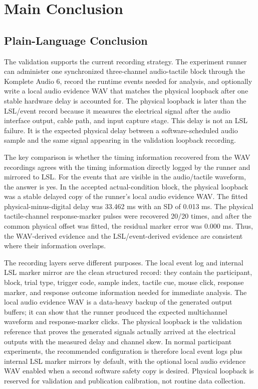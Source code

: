 \documentclass[11pt]{article}
\begin{document}
\section{Main Conclusion}

\subsection{Plain-Language Conclusion}

The validation supports the current recording strategy. The experiment runner
can administer one synchronized three-channel audio-tactile block through the
Komplete Audio 6, record the runtime events needed for analysis, and optionally
write a local audio evidence WAV that matches the physical loopback after one
stable hardware delay is accounted for. The physical loopback is later than the
LSL/event record because it measures the electrical signal after the audio
interface output, cable path, and input capture stage. This delay is not an LSL
failure. It is the expected physical delay between a software-scheduled audio
sample and the same signal appearing in the validation loopback recording.

The key comparison is whether the timing information recovered from the WAV
recordings agrees with the timing information directly logged by the runner and
mirrored to LSL. For the events that are visible in the audio/tactile waveform,
the answer is yes. In the accepted actual-condition block, the physical loopback
was a stable delayed copy of the runner's local audio evidence WAV. The fitted
physical-minus-digital delay was 33.462 ms with an SD of 0.013 ms. The physical
tactile-channel response-marker pulses were recovered 20/20 times, and after
the common physical offset was fitted, the residual marker error was 0.000 ms.
Thus, the WAV-derived evidence and the LSL/event-derived evidence are
consistent where their information overlaps.

The recording layers serve different purposes. The local event log and internal
LSL marker mirror are the clean structured record: they contain the participant,
block, trial type, trigger code, sample index, tactile cue, mouse click, response
marker, and response outcome information needed for immediate analysis. The
local audio evidence WAV is a data-heavy backup of the generated output buffers;
it can show that the runner produced the expected multichannel waveform and
response-marker clicks. The physical loopback is the validation reference that
proves the generated signals actually arrived at the electrical outputs with
the measured delay and channel skew. In normal participant experiments, the
recommended configuration is therefore local event logs plus internal LSL marker
mirrors by default, with the optional local audio evidence WAV enabled when a
second software safety copy is desired. Physical loopback is reserved for
validation and publication calibration, not routine data collection.
\end{document}
